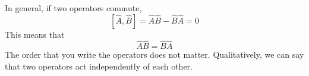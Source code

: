 \documentclass{article}
\begin{document}
In general, if two operators commute, 
\[ [\hat{A}, \hat{B}] = \hat{A}\hat{B} -\hat{B}\hat{A} = 0 \]
This means that
\[\hat{A}\hat{B} = \hat{B}\hat{A} \]
The order that you write the operators does not matter.
Qualitatively, we can say that two operators act independently of each other. 

\end{document}

